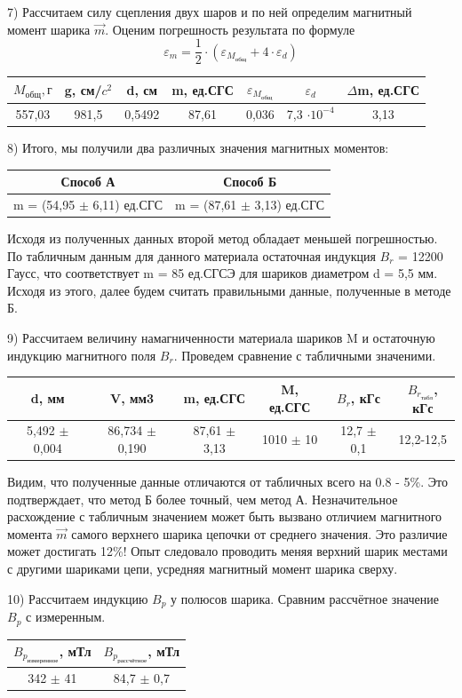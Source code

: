 \documentclass[a4paper,12pt]{article}
\begin{document}
7) Рассчитаем силу сцепления двух шаров и по ней определим магнитный момент шарика $\vec{m}$. Оценим погрешность результата по формуле $$ \varepsilon_m = \frac{1}{2} \cdot (\varepsilon_{M_{общ}} + 4 \cdot \varepsilon_d) $$

\begin{center}
\begin{tabular}{|c|c|c|c|c|c|c|}
	\hline
	$M_{общ}, г$ & g, см/$c^2$ & d, см & m, ед.СГС & $\varepsilon_{M_{общ}}$ & $\varepsilon_d$ & $\Delta$m, ед.СГС \\
	\hline
	557,03 & 981,5 & 0,5492 & 87,61 & 0,036 & 7,3 $\cdot 10^{-4}$ & 3,13 \\
	\hline
\end{tabular}
\end{center}

8) Итого, мы получили два различных значения магнитных моментов: 
\begin{center}
\begin{tabular}{|c|c|}
	\hline
	Способ А & Способ Б \\
	\hline
	m = (54,95 $\pm$ 6,11) ед.СГС & m = (87,61 $\pm$ 3,13) ед.СГС \\
	\hline
\end{tabular}
\end{center}

Исходя из полученных данных второй метод обладает меньшей погрешностью. 
По табличным данным для данного материала остаточная индукция $B_r$ = 12200 Гаусс, что соответствует m = 85 ед.СГСЭ для шариков диаметром d = 5,5 мм. 
Исходя из этого, далее будем считать правильными данные, полученные в методе Б.

9) Рассчитаем величину намагниченности материала шариков M и остаточную индукцию магнитного поля $B_r$. Проведем сравнение с табличными значеними. 

\begin{center}
\begin{tabular}{|c|c|c|c|c|c|}
	\hline
	d, мм & V, мм3 & m, ед.СГС & M, ед.СГС & $B_r$, кГс & $B_{r_{табл}}$, кГс \\
	\hline
	5,492 $\pm$ 0,004 & 86,734 $\pm$ 0,190 & 87,61 $\pm$ 3,13 & 1010 $\pm$ 10 & 12,7 $\pm$ 0,1 & 12,2-12,5\\
	\hline
\end{tabular}
\end{center}

Видим, что полученные данные отличаются от табличных всего на 0.8 - 5\%. Это подтверждает, что метод Б более точный, чем метод А. Незначительное расхождение с табличным значением может быть вызвано отличием магнитного момента $\vec{m}$ самого верхнего шарика цепочки от среднего значения. Это различие может достигать 12\%! Опыт следовало проводить меняя верхний шарик местами с другими шариками цепи, усредняя магнитный момент шарика сверху.

10) Рассчитаем индукцию $B_p$ у полюсов шарика. Сравним рассчётное значение $B_p$ с измеренным.

\begin{center}
\begin{tabular}{|c|c|}
	\hline
	$B_{p_{измеренное}}$, мТл & $B_{p_{рассчётное}}$, мТл \\
	\hline
	342 $\pm$ 41 & 84,7 $\pm$ 0,7 \\ 
	\hline
\end{tabular}
\end{center}
\end{document}
